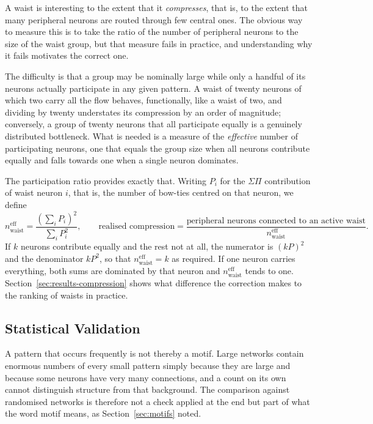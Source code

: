 \documentclass[12pt,a4paper,oneside]{article}
\theoremstyle{definition}
\theoremstyle{plain}
\newcommand{\sigmapi}{\ensuremath{\Sigma\Pi}}
\newcommand{\neff}{n^{\mathrm{eff}}_{\mathrm{waist}}}
\begin{document}
A waist is interesting to the extent that it \emph{compresses}, that is, to
the extent that many peripheral neurons are routed through few central ones.
The obvious way to measure this is to take the ratio of the number of
peripheral neurons to the size of the waist group, but that measure fails in
practice, and understanding why it fails motivates the correct one.

The difficulty is that a group may be nominally large while only a handful
of its neurons actually participate in any given pattern. A waist of twenty
neurons of which two carry all the flow behaves, functionally, like a waist
of two, and dividing by twenty understates its compression by an order of
magnitude; conversely, a group of twenty neurons that all participate
equally is a genuinely distributed bottleneck. What is needed is a measure
of the \emph{effective} number of participating neurons, one that equals the
group size when all neurons contribute equally and falls towards one when a
single neuron dominates.

The participation ratio provides exactly that. Writing $P_i$ for the
\sigmapi{} contribution of waist neuron $i$, that is, the number of bow-ties
centred on that neuron, we define
\begin{equation}
  \label{eq:neff}
  \neff = \frac{\left(\sum_i P_i\right)^2}{\sum_i P_i^2},
  \qquad
  \text{realised compression} =
  \frac{\text{peripheral neurons connected to an active waist}}{\neff}.
\end{equation}
If $k$ neurons contribute equally and the rest not at all, the numerator is
$(kP)^2$ and the denominator $kP^2$, so that $\neff = k$ as required. If one
neuron carries everything, both sums are dominated by that neuron and
$\neff$ tends to one. Section~\ref{sec:results-compression} shows what
difference the correction makes to the ranking of waists in practice.

\subsection{Statistical Validation}
\label{sec:validation-methods}


A pattern that occurs frequently is not thereby a motif. Large networks
contain enormous numbers of every small pattern simply because they are
large and because some neurons have very many connections, and a count on
its own cannot distinguish structure from that background. The comparison
against randomised networks is therefore not a check applied at the end but
part of what the word motif means, as Section~\ref{sec:motifs} noted.
\end{document}
